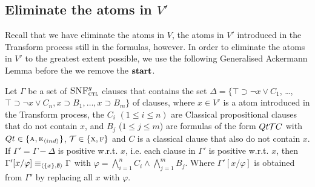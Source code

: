\documentclass[letterpaper]{article} %
\begin{document}
\subsection{Eliminate the atoms in $V'$}

Recall that we have eliminate the atoms in $V$, the atoms in $V'$ introduced in the Transform process still in the formulas, however. In order to eliminate the atoms in $V'$ to the greatest extent possible, we use the following Generalised Ackermann Lemma before the we remove the $\textbf{start}$.

\begin{theorem} \label{thm:Aclm}
  Let $\Gamma$ be a set of ${\textsc{SNF}_{\textsc{ctl}}^g}$ clauses that contains the set $\Delta = \{\top \supset \neg x \vee C_1$, \dots, $\top \supset \neg x \vee C_n, x \supset B_1, \dots, x \supset B_m\}$ of clauses, where $x \in V'$ is a atom introduced in the Transform process, the $C_i$ $(1 \leq i \leq n)$ are Classical propositional clauses that do not contain $x$, and $B_j$ ($1 \leq j \leq m$) are formulas of the form $Qt {\cal T} C$ with $Qt \in \{\textsc{a}, \textsc{e}_{{\langle{ind}\rangle}}\}$, ${\cal T}\in \{\textsc{x}, \textsc{f}\}$ and $C$ is a classical clause that also do not contain $x$. If $\Gamma'= \Gamma - \Delta$ is positive w.r.t. $x$, i.e. each clause in $\Gamma'$ is positive w.r.t. $x$, then $\Gamma'[x/\varphi] \equiv_{{\langle{\{x\}, \emptyset}\rangle}} \Gamma$ with $\varphi = \bigwedge_{i=1}^n C_i \wedge \bigwedge_{j=1}^m B_j$. Where $\Gamma'[x/\varphi]$ is obtained from $\Gamma'$ by replacing all $x$ with $\varphi$.
\end{theorem}
\end{document}
